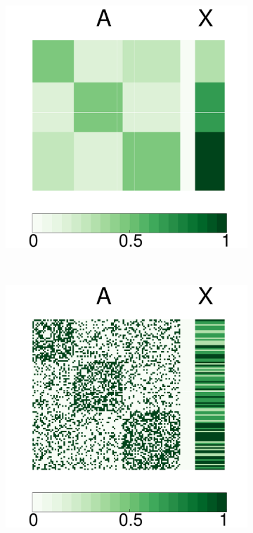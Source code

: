 \documentclass[12pt]{article}
\begin{document}
\begin{figure}[H]
	\centering
	\begin{subfigure}[b]{0.23\textwidth}
		\includegraphics[width=\textwidth]{../Figure/Pmat.pdf}
		\caption{}
		\label{fig:a}
	\end{subfigure}
	~ %
	\begin{subfigure}[b]{0.23\textwidth}
		\includegraphics[width=\textwidth]{../Figure/Amat.pdf}

\end{subfigure}
\end{figure}
\end{document}
